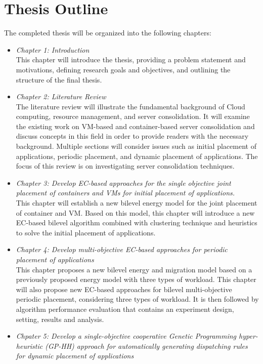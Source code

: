 \section{Thesis Outline}
The completed thesis will be organized into the following chapters:
\begin{itemize}
	\item \textit{Chapter 1: Introduction} \\
	This chapter will introduce the thesis, providing a problem statement and motivations, defining research goals and objectives, and outlining the structure of the final thesis.
	\item \textit{Chapter 2: Literature Review} \\
	The literature review will illustrate the fundamental background of Cloud computing, resource management, and server consolidation. It will examine the existing work on VM-based and container-based server consolidation and discuss concepts in this field in order to provide readers with the necessary background. Multiple sections will consider issues such as initial placement of applications, periodic placement, and dynamic placement of applications. The focus of this review is on investigating server consolidation techniques.
	\item \textit{Chapter 3: Develop EC-based approaches for the single objective joint placement of containers and VMs for initial placement of applications.} \\
	This chapter will establish a new bilevel energy model for the joint placement of container and VM. Based on this model, this chapter will introduce a new EC-based bilevel algorithm combined with clustering technique and heuristics to solve the initial placement of applications. 
	\item \textit{Chapter 4: Develop multi-objective EC-based approaches  for periodic placement of applications} \\
	This chapter proposes a new bilevel energy and migration model based on a previously proposed energy model with three types of workload.  This chapter will also propose new EC-based approaches for bilevel multi-objective periodic placement, considering three types of workload. It is then followed by algorithm performance evaluation that contains an experiment design, setting, results and analysis.
	\item \textit{Chpater 5: Develop a  single-objective cooperative Genetic Programming hyper-heuristic (GP-HH) approach for automatically generating dispatching rules for dynamic placement of applications} \\

\end{itemize}
